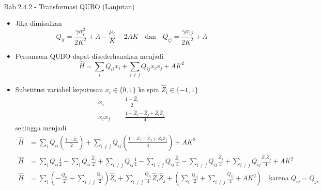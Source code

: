\begin{frame}{Bab 2.4.2 - Transformasi QUBO (Lanjutan)}
    \begin{itemize}
        \item Jika dimisalkan
        {\tiny
        \begin{equation*}
            Q_{ii} = \frac{\gamma \sigma_i^2}{2K^2} + A - \frac{\mu_i}{K} - 2AK \quad \text{dan} \quad Q_{ij} = \frac{\gamma \sigma_{ij}}{2K^2} + A
        \end{equation*}
        }
        \item Persamaan QUBO dapat disederhanakan menjadi
        {\tiny
        \begin{equation}
            \hat{H} = \sum_i Q_{ii} x_i + \sum_{i\ne j} Q_{ij} x_ix_j + AK^2
        \end{equation}
        }
        \item Substitusi variabel keputusan $x_i \in \{0, 1\}$ ke spin $\hat{Z}_i \in \{-1, 1\}$
        {\tiny
        \begin{equation}
            \begin{split}
                x_i     &= \frac{1 - \hat{Z}_i}{2} \\
                x_ix_j  &= \frac{1 - \hat{Z}_i - \hat{Z}_j + \hat{Z}_i \hat{Z}_j}{4}
            \end{split}
        \end{equation}
        }
        sehingga menjadi
        {\tiny
        \begin{equation}
            \begin{split}
                \hat{H} &= \sum_i Q_{ii} \left(\frac{1 - \hat{Z}_i}{2}\right) + \sum_{i\ne j} Q_{ij} \left(\frac{1 - \hat{Z}_i - \hat{Z}_j + \hat{Z}_i \hat{Z}_j}{4}\right) + AK^2 \\
                \hat{H} &= \sum_i Q_{ii} \frac{1}{2} - \sum_i Q_{ii} \frac{\hat{Z}_i}{2} + \sum_{i\ne j} Q_{ij} \frac{1}{4} - \sum_{i\ne j} Q_{ij} \frac{\hat{Z}_i}{4} - \sum_{i\ne j} Q_{ij} \frac{\hat{Z}_j}{4} + \sum_{i\ne j} Q_{ij} \frac{\hat{Z}_i \hat{Z}_j}{4} + AK^2 \\
                \hat{H} &= \sum_i \left(- \frac{Q_{ii}}{2} - \sum_{i\ne j} \frac{Q_{ij}}{2}\right) \hat{Z}_i + \sum_{i\ne j} \frac{Q_{ij}}{4} \hat{Z}_i \hat{Z}_j + \left(\sum_i \frac{Q_{ii}}{2} + \sum_{i\ne j} \frac{Q_{ij}}{4} + AK^2\right) \quad \text{karena } Q_{ij} = Q_{ji}
            \end{split}
        \end{equation}
        }
    \end{itemize}
\end{frame}

